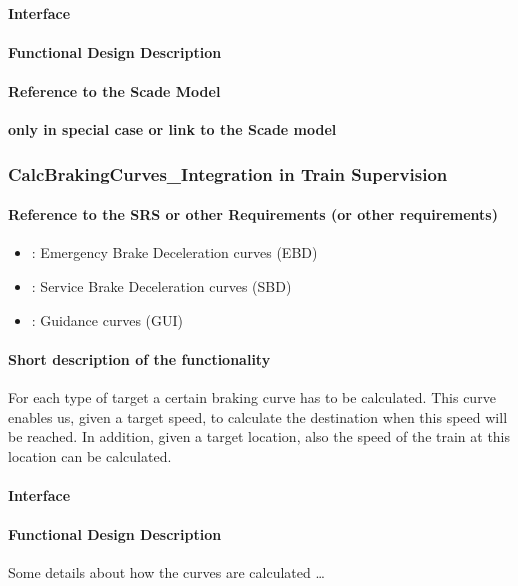 \paragraph{Interface}

\paragraph{Functional Design Description}

\paragraph{Reference to the Scade Model}
\textbf{only in special case or link to the Scade model}

\subsubsection{CalcBrakingCurves\_Integration in Train Supervision} 
\paragraph{Reference to the SRS or other Requirements (or other requirements)}
\begin{itemize}
	\item \cite[Chapt.~3.13.8.3]{subset-026}: Emergency Brake Deceleration curves (EBD)
	\item \cite[Chapt.~3.13.8.4]{subset-026}: Service Brake Deceleration curves (SBD)
	\item \cite[Chapt.~3.13.8.5]{subset-026}: Guidance curves (GUI)
\end{itemize}
\paragraph{Short description of the functionality}
For each type of target a certain braking curve has to be calculated. This curve enables us, given a target speed, to calculate the destination when this speed will be reached. In addition, given a target location, also the speed of the train at this location can be calculated. 
\paragraph{Interface}
\paragraph{Functional Design Description}
Some details about how the curves are calculated \dots

